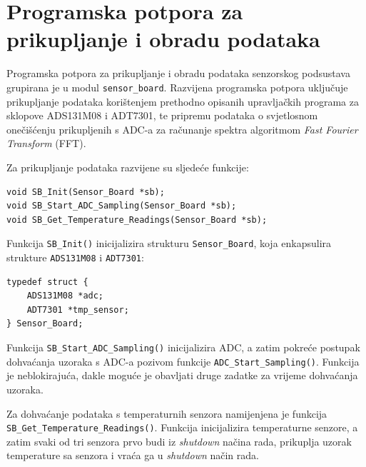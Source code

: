 \section{Programska potpora za prikupljanje i obradu podataka} \label{obrada}

Programska potpora za prikupljanje i obradu podataka senzorskog podsustava grupirana je u modul \texttt{sensor\_board}. Razvijena programska potpora uključuje prikupljanje podataka korištenjem prethodno opisanih upravljačkih programa za sklopove ADS131M08 i ADT7301, te pripremu podataka o svjetlosnom onečišćenju prikupljenih s ADC-a za računanje spektra algoritmom \textit{Fast Fourier Transform} (FFT).

Za prikupljanje podataka razvijene su sljedeće funkcije:
\begin{lstlisting}[caption={Funkcije za prikupljanje podataka senzorskog podsustava}]
void SB_Init(Sensor_Board *sb);
void SB_Start_ADC_Sampling(Sensor_Board *sb);
void SB_Get_Temperature_Readings(Sensor_Board *sb);
\end{lstlisting}

Funkcija \texttt{SB\_Init()} inicijalizira strukturu \texttt{Sensor\_Board}, koja enkapsulira strukture \texttt{ADS131M08} i \texttt{ADT7301}:
\begin{lstlisting}[caption={Definicija tipa \texttt{Sensor\_Board}}]
typedef struct {
    ADS131M08 *adc;
    ADT7301 *tmp_sensor;
} Sensor_Board;
\end{lstlisting}

Funkcija \texttt{SB\_Start\_ADC\_Sampling()} inicijalizira ADC, a zatim pokreće postupak dohvaćanja uzoraka s ADC-a pozivom funkcije \texttt{ADC\_Start\_Sampling()}. Funkcija je neblokirajuća, dakle moguće je obavljati druge zadatke za vrijeme dohvaćanja uzoraka.

Za dohvaćanje podataka s temperaturnih senzora namijenjena je funkcija \\\texttt{SB\_Get\_Temperature\_Readings()}. Funkcija inicijalizira temperaturne senzore, a zatim svaki od tri senzora prvo \glqq{}budi\grqq{} iz \textit{shutdown} načina rada, prikuplja uzorak temperature sa senzora i vraća ga u \textit{shutdown} način rada.

